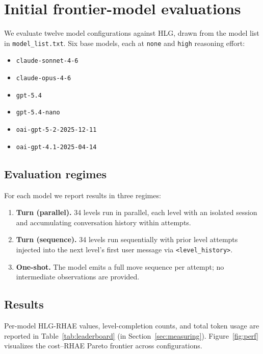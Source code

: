 \section{Initial frontier-model evaluations}
\label{sec:evals}

We evaluate twelve model configurations against HLG, drawn from the model list in
\texttt{model\_list.txt}. Six base models, each at \texttt{none} and \texttt{high}
reasoning effort:

\begin{itemize}[leftmargin=1.5em]
    \item \texttt{claude-sonnet-4-6}
    \item \texttt{claude-opus-4-6}
    \item \texttt{gpt-5.4}
    \item \texttt{gpt-5.4-nano}
    \item \texttt{oai-gpt-5-2-2025-12-11}
    \item \texttt{oai-gpt-4.1-2025-04-14}
\end{itemize}

\subsection{Evaluation regimes}

For each model we report results in three regimes:
\begin{enumerate}[leftmargin=1.5em]
    \item \textbf{Turn (parallel).} 34 levels run in parallel, each level with an
      isolated session and accumulating conversation history within attempts.
    \item \textbf{Turn (sequence).} 34 levels run sequentially with prior level
      attempts injected into the next level's first user message via
      \texttt{<level\_history>}.
    \item \textbf{One-shot.} The model emits a full move sequence per attempt; no
      intermediate observations are provided.
\end{enumerate}

\subsection{Results}

Per-model HLG-RHAE values, level-completion counts, and total token usage are reported in
Table~\ref{tab:leaderboard} (in Section~\ref{sec:measuring}). Figure~\ref{fig:perf}
visualizes the cost--RHAE Pareto frontier across configurations.

